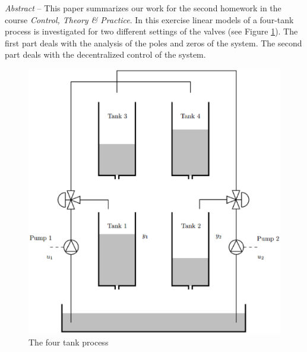 \begin{bfseries}
\emph{Abstract} -- 
This paper summarizes our work for the second homework in the course \emph{Control, Theory \& Practice}. 
In this exercise linear models of a four-tank process is investigated for two different settings of the valves (see Figure \ref{tank}).
The first part deals with the analysis of the poles and zeros of the system.
The second part deals with the decentralized control of the system.
\end{bfseries}

\begin{center}
\begin{figure}[h!b]
    \includegraphics[width=\columnwidth]{fig/tank.eps}
    \caption{The four tank process}
    \label{tank}
\end{figure}
\end{center}
